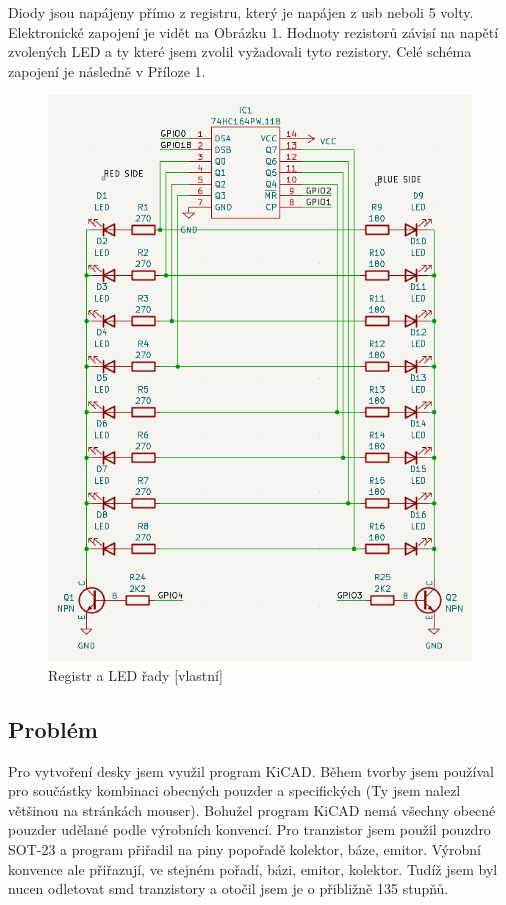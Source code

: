 \documentclass[12pt,a4paper]{article}
\begin{document}
Diody jsou napájeny přímo z registru, který je napájen z usb neboli 5 volty. Elektronické zapojení je vidět na Obrázku 1. Hodnoty rezistorů závisí na napětí zvolených LED a ty které jsem zvolil vyžadovali tyto rezistory. Celé schéma zapojení je následně v Příloze 1.

\begin{figure}[H]
    \centering
    \includegraphics[width=\textwidth-3 cm]{pictures/register_LED.png}
    \caption{Registr a LED řady [vlastní]}
\end{figure}

\subsection{Problém}
Pro vytvoření desky jsem využil program KiCAD. Během tvorby jsem používal pro součástky kombinaci obecných pouzder a specifických (Ty jsem nalezl většinou na stránkách mouser). Bohužel program KiCAD nemá všechny obecné pouzder udělané podle výrobních konvencí. Pro tranzistor jsem použil pouzdro SOT-23 a program přiřadil na piny popořadě kolektor, báze, emitor. Výrobní konvence ale přiřazují, ve stejném pořadí, bázi, emitor, kolektor. Tudíž jsem byl nucen odletovat smd tranzistory a otočil jsem je o přibližně 135 stupňů.
\end{document}
